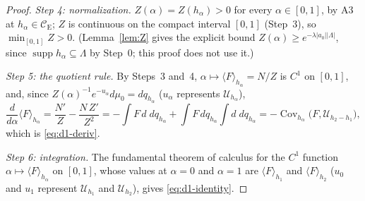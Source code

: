 \documentclass[11pt,a4paper]{article}
\theoremstyle{plain}
\theoremstyle{definition}
\theoremstyle{plain}
\theoremstyle{definition}
\newcommand{\CE}{\mathcal{C}_{\mathrm E}}
\DeclareMathOperator{\supp}{supp}
\DeclareMathOperator{\Cov}{Cov}
\newcommand{\ev}[2]{\langle #1\rangle_{#2}}            %
\newcommand{\Uc}{\mathcal U}
\begin{document}
\begin{proof}
\emph{Step 4: normalization.} $Z(\alpha)=Z(h_\alpha)>0$ for every $\alpha\in[0,1]$, by A3 at
$h_\alpha\in\CE$; $Z$ is continuous on the compact interval $[0,1]$ (Step~3), so
$\min_{[0,1]}Z>0$. (Lemma~\ref{lem:Z} gives the explicit bound
$Z(\alpha)\ge e^{-\lambda|a_0||\Lambda|}$, since $\supp h_\alpha\subseteq\Lambda$ by Step~0;
this proof does not use it.)

\emph{Step 5: the quotient rule.} By Steps~3 and~4, $\alpha\mapsto\ev{F}{h_\alpha}=N/Z$ is
$C^1$ on $[0,1]$, and, since $Z(\alpha)^{-1}e^{-u_\alpha}d\mu_0=dq_{h_\alpha}$ ($u_\alpha$
represents $\Uc_{h_\alpha}$),
\[
 \frac{d}{d\alpha}\ev{F}{h_\alpha}=\frac{N'}{Z}-\frac{N\,Z'}{Z^2}
 =-\int F\,d\;dq_{h_\alpha}+\int F\,dq_{h_\alpha}\int d\;dq_{h_\alpha}
 =-\Cov_{h_\alpha}\bigl(F,\Uc_{h_2-h_1}\bigr),
\]
which is \eqref{eq:d1-deriv}.

\emph{Step 6: integration.} The fundamental theorem of calculus for the $C^1$ function
$\alpha\mapsto\ev{F}{h_\alpha}$ on $[0,1]$, whose values at $\alpha=0$ and $\alpha=1$ are
$\ev{F}{h_1}$ and $\ev{F}{h_2}$ ($u_0$ and $u_1$ represent $\Uc_{h_1}$ and $\Uc_{h_2}$), gives
\eqref{eq:d1-identity}.
\end{proof}
\end{document}
